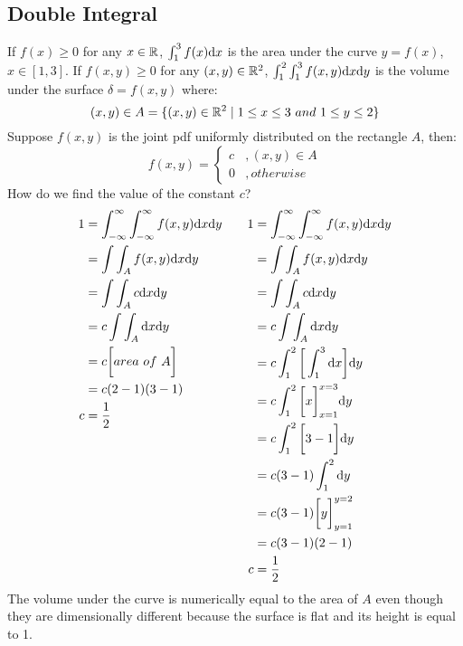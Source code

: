 \documentclass{math}
\begin{document}
\subsection*{Double Integral}
If \( f(x)\geq0 \) for any \( x\in\mathbb{R} \), \( \int_{1}^{3}f(x)\mathrm{d}{x} \) is
the area under the curve \( y = f(x) \), \( x\in[1,3] \). If \( f(x,y)\geq0 \)
for any \( (x,y)\in\mathbb{R}^{2} \), \( \int_{1}^{2}\int_{1}^{3}f(x,y)\mathrm{d}{x}\mathrm{d}{y}
\) is the volume under the surface \( \delta = f(x,y) \) where:
\[ (x,y)\in A = \{(x,y)\in\mathbb{R}^{2}\mid 1\leq x\leq 3\ and\ 1\leq y\leq 2 \} \]
Suppose \( f(x,y) \) is the joint pdf uniformly distributed on the rectangle
\( A \), then:
\[ f(x,y) = \begin{cases}
  c &, (x,y)\in A \\
  0 &, otherwise\end{cases}
\]
How do we find the value of the constant \( c \)?
\begin{equation*}
  \begin{aligned}[t]
    1 &= \int_{-\infty}^{\infty}\int_{-\infty}^{\infty}f(x,y)\mathrm{d}{x}\mathrm{d}{y} \\
    &= \int\int_{A}f(x,y)\mathrm{d}{x}\mathrm{d}{y} \\
    &= \int\int_{A}c\mathrm{d}{x}\mathrm{d}{y} \\
    &= c\int\int_{A}\mathrm{d}{x}\mathrm{d}{y} \\
    &= c\bigg[area\ of\ A\bigg] \\
    &= c(2-1)(3-1) \\
    c &= \frac{1}{2}
  \end{aligned}
  \quad\quad
  \begin{aligned}[t]
    1 &= \int_{-\infty}^{\infty}\int_{-\infty}^{\infty}f(x,y)\mathrm{d}{x}\mathrm{d}{y} \\
    &= \int\int_{A}f(x,y)\mathrm{d}{x}\mathrm{d}{y} \\
    &= \int\int_{A}c\mathrm{d}{x}\mathrm{d}{y} \\
    &= c\int\int_{A}\mathrm{d}{x}\mathrm{d}{y} \\
    &= c\int_{1}^{2}\bigg[\int_{1}^{3}\mathrm{d}{x}\bigg]\mathrm{d}{y} \\
    &= c\int_{1}^{2}\bigg[x\bigg]_{x=1}^{x=3}\mathrm{d}{y} \\
    &= c\int_{1}^{2}\bigg[3-1\bigg]\mathrm{d}{y} \\
    &= c(3-1)\int_{1}^{2}\mathrm{d}{y} \\
    &= c(3-1)\bigg[y\bigg]_{y=1}^{y=2} \\
    &= c(3-1)(2-1) \\
    c &= \frac{1}{2}
  \end{aligned}
\end{equation*}
The volume under the curve is numerically equal to the area of \( A \) even
though they are dimensionally different because the surface is flat and its
height is equal to 1.
\end{document}
